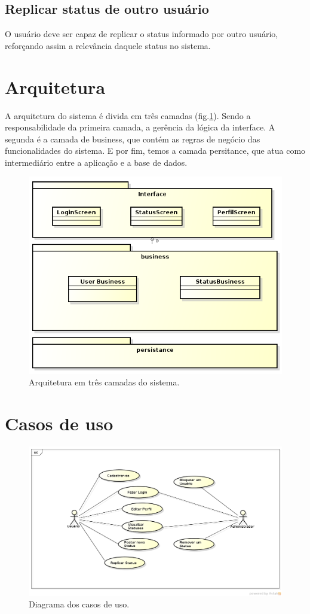 \documentclass[12pt]{article}
\begin{document}
\subsection{Replicar status de outro usuário}
O usuário deve ser capaz de replicar o status informado por outro usuário, reforçando assim a relevância daquele status no sistema.

\newpage
\section{Arquitetura}

A arquitetura do sistema é divida em três camadas (fig.\ref{fig:arqfig}). Sendo a responsabilidade da primeira camada, a gerência da lógica da interface. A segunda é a camada de business, que
contém as regras de negócio das funcionalidades do sistema. E por fim, temos a camada persitance, que atua como intermediário entre a aplicação e a base de dados.

\begin{figure}[ht]
\centering
\includegraphics[width=.7\textwidth]{assets/img/arquitetura.png}
\caption{Arquitetura em três camadas do sistema.}
\label{fig:arqfig}
\end{figure}

\section{Casos de uso}

\begin{figure}[ht]
  \centering
  \includegraphics[width=.7\textwidth]{assets/img/useCases.png}
  \caption{Diagrama dos casos de uso.}
  \label{fig:usecasesfig}
\end{figure}
\end{document}
